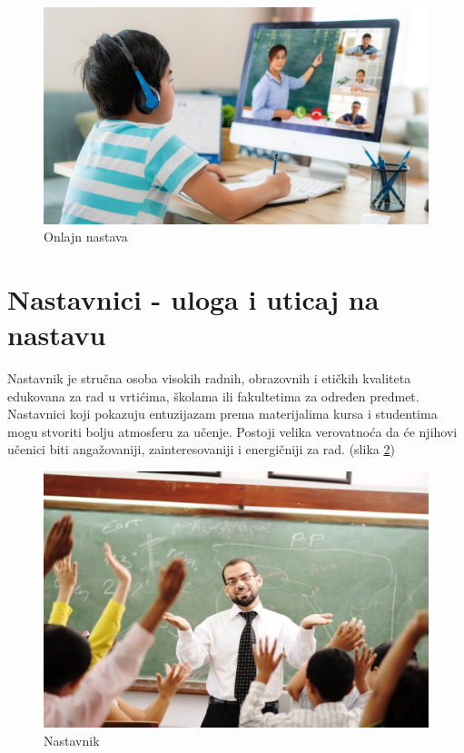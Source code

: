 \documentclass[a4paper]{article}
\begin{document}
\begin{figure}[ht!]
\begin{center}
\includegraphics[scale=0.23]{online.jpg}
\end{center}
\caption{Onlajn nastava}
\label{fig:online}
\end{figure}

\newpage
\section{Nastavnici - uloga i uticaj na nastavu}
\label{sec:naslov2}

Nastavnik je stručna osoba visokih radnih, obrazovnih i etičkih kvaliteta edukovana za rad u vrtićima, školama ili fakultetima za određen predmet.
Nastavnici koji pokazuju entuzijazam prema materijalima kursa i studentima mogu stvoriti bolju atmosferu za učenje. Postoji velika verovatnoća da će njihovi učenici biti angažovaniji, zainteresovaniji i energičniji za rad. (slika \ref{fig:nastavnik})

\begin{figure}[ht!]
\begin{center}
\includegraphics[scale=1.3]{nastavnik.jpg}
\end{center}
\caption{Nastavnik}
\label{fig:nastavnik}
\end{figure}
\end{document}
